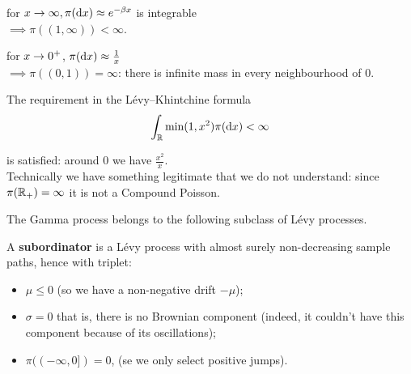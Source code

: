 \documentclass[class=article,crop=false]{standalone}
\begin{document}
\begin{itemize}
	\begin{minipage}{0.5\textwidth}
		\item for $x \rightarrow \infty, \pi(\mathop{}\!\mathrm{d} x) \approx e^{-\beta x} $ is integrable \\$ \implies\pi((1,\infty)) < \infty$. 
	\end{minipage}
	\begin{minipage}{0.4\textwidth}
		\begin{figure}[H]
			\centering
			
		\end{figure}
	\end{minipage}\par
	\begin{minipage}{0.5\textwidth}
		\item for $x \rightarrow 0^+$, $\pi(\mathop{}\!\mathrm{d} x)  \approx \frac{1}{x}$ \\ $\implies \pi\left((0,1)\right)=\infty$: there is infinite mass in every neighbourhood of 0.
	\end{minipage}
	\begin{minipage}{0.4\textwidth}
		\begin{figure}[H]
			\centering
			
		\end{figure}
	\end{minipage}
        The requirement in the L\'evy–Khintchine formula 
\begin{equation*}
	\int_\mathbb{R} \min(1,x^2) \pi(\mathop{}\!\mathrm{d} x) < \infty
\end{equation*}

is satisfied: around $0$ we have $\frac{x^2}{x}$. \\
Technically we have something legitimate that we do not understand:
since $\pi(\mathbb{R}_+)=\infty$ it is not a Compound Poisson.\\  
\end{itemize}
The Gamma process belongs to the following subclass of L\'evy processes.
\begin{definition}
	 A \textbf{subordinator} is a L\'evy process with almost surely non-decreasing sample paths, hence with triplet:
	\begin{itemize}
		\item $\mu \leq 0$ (so we have a non-negative drift $-\mu$);
		\item $\sigma = 0$ that is, there is no Brownian component (indeed, it couldn't have this component because of its oscillations); %
		\item $\pi((-\infty,0]) = 0$, (se we only select positive jumps). 
	\end{itemize}
\end{definition}
\end{document}
